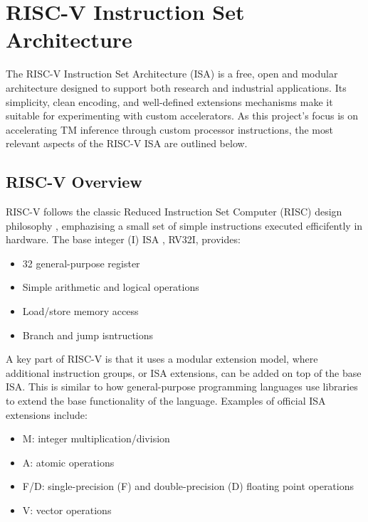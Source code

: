 

\section{RISC-V Instruction Set Architecture}

The RISC-V Instruction Set Architecture (ISA) is a free, open and modular architecture designed to support both research and industrial applications. Its simplicity, clean encoding, and well-defined extensions mechanisms make it suitable for experimenting with custom accelerators. As this project's focus is on accelerating TM inference through custom processor instructions, the most relevant aspects of the RISC-V ISA are outlined below.

\subsection{RISC-V Overview}

RISC-V follows the classic Reduced Instruction Set Computer (RISC) design philosophy \cite{AsanovicPatterson2014}, emphazising a small set of simple instructions executed efficifently in hardware. The base integer (I) ISA \cite{WatermanLee2011}, RV32I, provides:

\begin{itemize}
    \item 32 general-purpose register
    \item Simple arithmetic and logical operations
    \item Load/store memory access
    \item Branch and jump isntructions
\end{itemize}

A key part of RISC-V is that it uses a modular extension model, where additional instruction groups, or ISA extensions, can be added on top of the base ISA. This is similar to how general-purpose programming languages use libraries to extend the base functionality of the language. Examples of official ISA extensions include:

\begin{itemize}
    \item M: integer multiplication/division
    \item A: atomic operations
    \item F/D: single-precision (F) and double-precision (D) floating point operations
    \item V: vector operations
\end{itemize}

